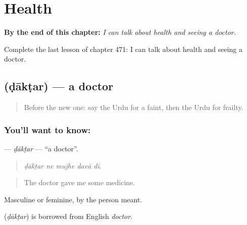 
\chapter{Health}
\label{ch:ur-health}

\begin{chapteropening}
\textbf{By the end of this chapter:} \emph{I can talk about health and seeing a doctor.}

Complete the last lesson of chapter 471: I can talk about health and seeing a doctor.
\end{chapteropening}

\section[\texorpdfstring{\ur{ڈاکٹر} (ḍākṭar)}{ڈاکٹر (ḍākṭar)}]{ (ḍākṭar) — a doctor}

\label{lesson:UR-C471-daktar}



\begin{quote}
Before the new one: say the Urdu for a faint, then the Urdu for frailty.
\end{quote}

\subsection*{You'll want to know: }
\textbf{} — \emph{ḍākṭar} — \textquotedblleft{}a doctor\textquotedblright{}.

\begin{quote}
    
\end{quote}

\begin{quote}
\emph{ḍākṭar ne mujhe davā dī.}
\end{quote}

\begin{quote}
The doctor gave me some medicine.
\end{quote}

Masculine or feminine, by the person meant.

\begin{cousinweb}
\textbf{} (\emph{ḍākṭar}) is borrowed from English \emph{doctor}.
\end{cousinweb}

